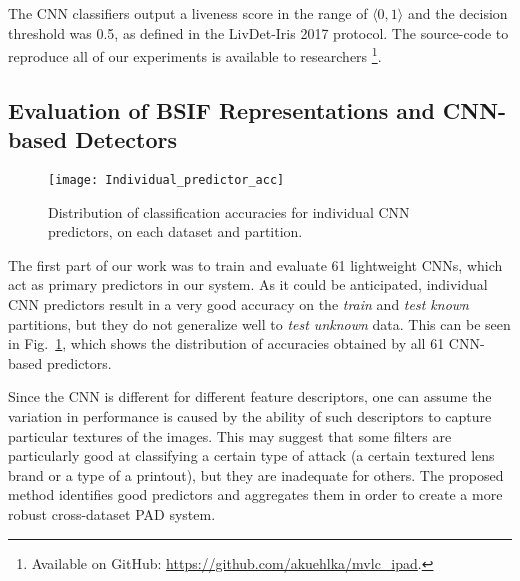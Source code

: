 The CNN classifiers output a liveness score in the range of $\langle 0,1 \rangle$ and the decision threshold was 0.5, as defined in the LivDet-Iris 2017 protocol. The source-code to reproduce all of our experiments is available to researchers \footnote{Available on GitHub: \url{https://github.com/akuehlka/mvlc_ipad}.}.


\subsection{Evaluation of BSIF Representations and CNN-based Detectors}
\label{sec:evaluation_bsif_cnns}


\begin{figure}[!hb]
    \centering
    \texttt{[image: Individual\_predictor\_acc]}
    \caption{Distribution of classification accuracies for individual CNN predictors, on each dataset and partition.}
    \label{fig:individual_accuracy}
\end{figure}

The first part of our work was to train and evaluate 61 lightweight CNNs, which act as primary predictors in our system.
As it could be anticipated, individual CNN predictors result in a very good accuracy on the \emph{train} and \emph{test known} partitions, but they do not generalize well to \emph{test unknown} data. This can be seen in Fig.~\ref{fig:individual_accuracy}, which shows the distribution of accuracies obtained by all 61 CNN-based predictors.

Since the CNN is different for different feature descriptors, one can assume the variation in performance is caused by the ability of such descriptors to capture particular textures of the images. This may suggest that some filters are particularly good at classifying a certain type of attack (a certain textured lens brand or a type of a printout), but they are inadequate for others. The proposed method identifies good predictors and aggregates them in order to create a more robust cross-dataset PAD system.

